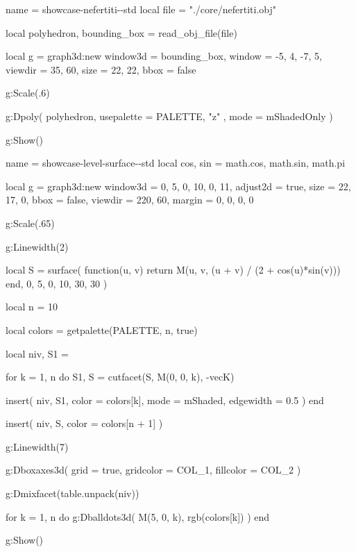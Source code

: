 
\vfill

\begin{luadraw}{name = showcase-nefertiti-\PALETTE-std}
local file = "./core/nefertiti.obj"

local polyhedron, bounding_box = read_obj_file(file)

local g = graph3d:new{
  window3d = bounding_box,
  window   = {-5, 4, -7, 5},
  viewdir  = {35, 60},
  size     = {22, 22},
  bbox     = false
}

g:Scale(.6)

g:Dpoly(
  polyhedron,
  {
    usepalette = {PALETTE, "z" },
    mode       = mShadedOnly
  }
)

g:Show()
\end{luadraw}



\vfill

\begin{luadraw}{name = showcase-level-surface-\PALETTE-std}
local cos, sin = math.cos, math.sin, math.pi

local g = graph3d:new{
  window3d = {0, 5, 0, 10, 0, 11},
  adjust2d = true,
  size     = {22, 17, 0},
  bbox     = false,
  viewdir  = {220, 60},
  margin   = {0, 0, 0, 0}
}

g:Scale(.65)

g:Linewidth(2)

local S = surface(
  function(u, v)
    return M(u, v, (u + v) / (2 + cos(u)*sin(v)))
  end,
  0, 5, 0, 10,
  {30, 30}
)

local n = 10

local colors = getpalette(PALETTE, n, true)

local niv, S1 = {}

for k = 1, n do
  S1, S = cutfacet(S, {M(0, 0, k), -vecK})

  insert(
    niv,
    {
      S1,
      {
        color     = colors[k],
        mode      = mShaded,
        edgewidth = 0.5
      }
    }
  )
end

insert(
  niv,
  {
    S,
    {color = colors[n + 1]}
  }
)

g:Linewidth(7)

g:Dboxaxes3d({
  grid      = true,
  gridcolor = COL_1,
  fillcolor = COL_2
})

g:Dmixfacet(table.unpack(niv))

for k = 1, n do
  g:Dballdots3d(
    M(5, 0, k),
    rgb(colors[k])
  )
end

g:Show()
\end{luadraw}


